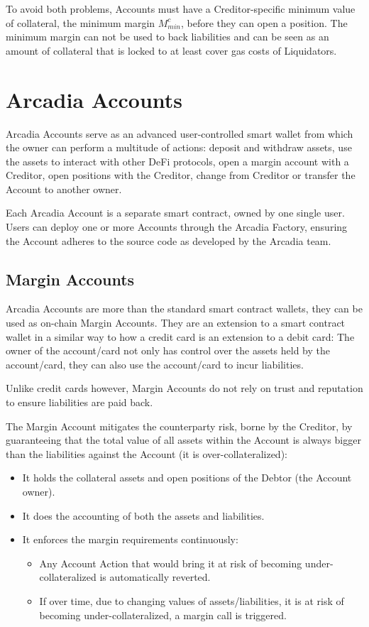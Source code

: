 \documentclass[sigconf,nonacm]{acmart}
\begin{document}
To avoid both problems, Accounts must have a Creditor-specific minimum value of collateral, the minimum margin $M_{min}^c$, before they can open a position.
The minimum margin can not be used to back liabilities and can be seen as an amount of collateral that is locked to at least cover gas costs of Liquidators.

\section{Arcadia Accounts}
\label{sec:arcadia-accounts}
Arcadia Accounts serve as an advanced user-controlled smart wallet from which the owner can perform a multitude of actions: deposit and withdraw assets,
use the assets to interact with other DeFi protocols, open a margin account with a Creditor, open positions with the Creditor,
change from Creditor or transfer the Account to another owner.

Each Arcadia Account is a separate smart contract, owned by one single user.
Users can deploy one or more Accounts through the Arcadia Factory, ensuring the Account adheres to the source code as developed by the Arcadia team.

\subsection{Margin Accounts}
\label{subsec:margin-accounts}
Arcadia Accounts are more than the standard smart contract wallets, they can be used as on-chain Margin Accounts.
They are an extension to a smart contract wallet in a similar way to how a credit card is an extension to a debit card:
The owner of the account/card not only has control over the assets held by the account/card,
they can also use the account/card to incur liabilities.

Unlike credit cards however, Margin Accounts do not rely on trust and reputation to ensure liabilities are paid back.

The Margin Account mitigates the counterparty risk, borne by the Creditor,
by guaranteeing that the total value of all assets within the Account is always bigger than the liabilities against the Account (it is over-collateralized):
\begin{itemize}
    \item It holds the collateral assets and open positions of the Debtor (the Account owner).
    \item It does the accounting of both the assets and liabilities.
    \item It enforces the margin requirements continuously:
    \begin{itemize}
        \item Any Account Action that would bring it at risk of becoming under-collateralized is automatically reverted.
        \item If over time, due to changing values of assets/liabilities, it is at risk of becoming under-collateralized, a margin call is triggered.
    \end{itemize}
\end{itemize}
\end{document}
